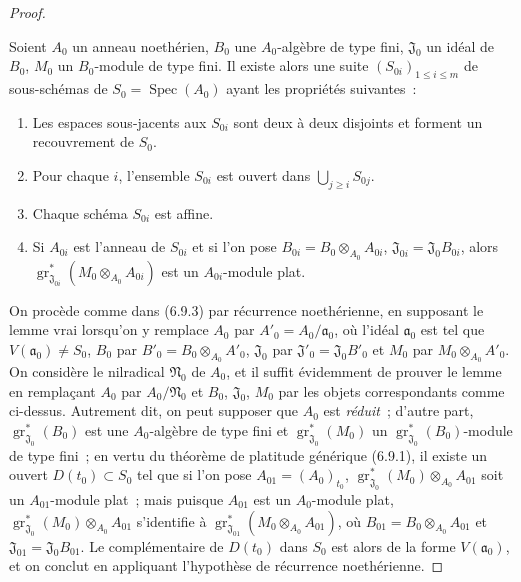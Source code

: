 \begin{proof}
\begin{lemma}[11.2.9.5]
\label{IV.11.2.9.5-fr}
Soient $A_0$ un anneau noethérien, $B_0$ une $A_0$-algèbre de type fini,
$\mathfrak J_0$ un idéal de $B_0$, $M_0$ un $B_0$-module de type fini. Il
existe alors une suite $(S_{0i})_{1\leq i\leq m}$ de sous-schémas de
$S_0=\operatorname{Spec}(A_0)$ ayant les propriétés suivantes~:
\begin{enumerate}[label=\arabic{enumi}$^\circ$]
\item Les espaces sous-jacents aux $S_{0i}$ sont deux à deux disjoints et
forment un recouvrement de $S_0$.
\item Pour chaque $i$, l'ensemble $S_{0i}$ est ouvert dans
$\bigcup_{j\geq i}S_{0j}$.
\item Chaque schéma $S_{0i}$ est affine.
\item Si $A_{0i}$ est l'anneau de $S_{0i}$ et si l'on pose
$B_{0i}=B_0\otimes_{A_0}A_{0i}$, $\mathfrak J_{0i}=\mathfrak J_0B_{0i}$,
alors
$\operatorname{gr}_{\mathfrak J_{0i}}^*(M_0\otimes_{A_0}A_{0i})$ est un
$A_{0i}$-module plat.
\end{enumerate}
\end{lemma}

On procède comme dans (6.9.3) par récurrence noethérienne, en supposant le
lemme vrai lorsqu'on y remplace $A_0$ par $A'_0=A_0/\mathfrak a_0$, où
l'idéal $\mathfrak a_0$ est tel que $V(\mathfrak a_0)\neq S_0$, $B_0$ par
$B'_0=B_0\otimes_{A_0}A'_0$, $\mathfrak J_0$ par
$\mathfrak J'_0=\mathfrak J_0B'_0$ et $M_0$ par $M_0\otimes_{A_0}A'_0$. On
considère le nilradical $\mathfrak N_0$ de $A_0$, et il suffit évidemment de
prouver le lemme en remplaçant $A_0$ par $A_0/\mathfrak N_0$ et $B_0$,
$\mathfrak J_0$, $M_0$ par les objets correspondants comme ci-dessus.
Autrement dit, on peut supposer que $A_0$ est \emph{réduit}~; d'autre part,
$\operatorname{gr}_{\mathfrak J_0}^*(B_0)$ est une $A_0$-algèbre de type fini
et $\operatorname{gr}_{\mathfrak J_0}^*(M_0)$ un
$\operatorname{gr}_{\mathfrak J_0}^*(B_0)$-module de type fini~; en vertu du
théorème de platitude générique (6.9.1), il existe un ouvert
$D(t_0)\subset S_0$ tel que si l'on pose $A_{01}=(A_0)_{t_0}$,
$\operatorname{gr}_{\mathfrak J_0}^*(M_0)\otimes_{A_0}A_{01}$ soit un
$A_{01}$-module plat~; mais puisque $A_{01}$ est un $A_0$-module plat,
$\operatorname{gr}_{\mathfrak J_0}^*(M_0)\otimes_{A_0}A_{01}$ s'identifie à
$\operatorname{gr}_{\mathfrak J_{01}}^*(M_0\otimes_{A_0}A_{01})$, où
$B_{01}=B_0\otimes_{A_0}A_{01}$ et $\mathfrak J_{01}=\mathfrak J_0B_{01}$.
Le complémentaire de $D(t_0)$ dans $S_0$ est alors de la forme
$V(\mathfrak a_0)$, et on conclut en appliquant l'hypothèse de récurrence
noethérienne.


\end{proof}
